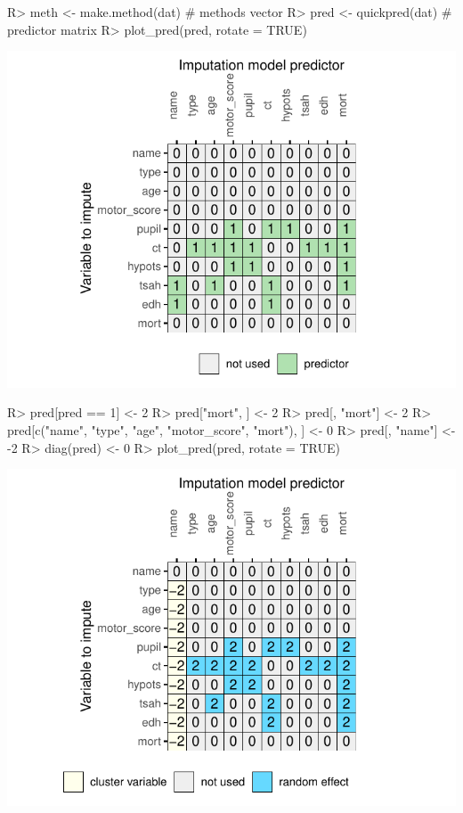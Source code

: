 \documentclass[
]{jss}
\begin{document}
\begin{CodeChunk}
\begin{CodeInput}
R> meth <- make.method(dat) # methods vector
R> pred <- quickpred(dat)   # predictor matrix
R> plot_pred(pred, rotate = TRUE)
\end{CodeInput}


\begin{center}\includegraphics{Imputation_of_Incomplete_Multilevel_Data_files/figure-latex/impact-1} \end{center}

\begin{CodeInput}
R> pred[pred == 1] <- 2
R> pred["mort", ] <- 2
R> pred[, "mort"] <- 2
R> pred[c("name", "type", "age", "motor_score", "mort"), ] <- 0
R> pred[, "name"] <- -2
R> diag(pred) <- 0
R> plot_pred(pred, rotate = TRUE)
\end{CodeInput}


\begin{center}\includegraphics{Imputation_of_Incomplete_Multilevel_Data_files/figure-latex/impact-2} \end{center}


\end{CodeChunk}
\end{document}
